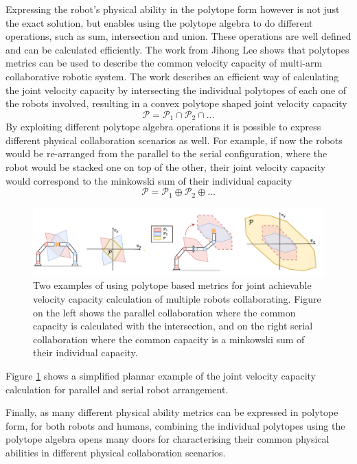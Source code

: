 Expressing the robot's physical ability in the polytope form however is not just the exact solution, but enables using the polytope algebra to do different operations, such as sum, intersection and union. These operations are well defined and can be calculated efficiently. The work from Jihong Lee \cite{lee2001velocity} shows that polytopes metrics can be used to describe the common velocity capacity of multi-arm collaborative robotic system.  The work describes an efficient way of calculating the joint velocity capacity by intersecting the individual polytopes of each one of the robots involved, resulting in a convex polytope shaped joint velocity capacity $$\mathcal{P}=\mathcal{P}_1 \cap \mathcal{P}_2  \cap \ldots$$
By exploiting different polytope algebra operations it is possible to express different physical collaboration scenarios as well. For example, if now the robots would be re-arranged from the parallel to the serial configuration, where the robot would be stacked one on top of the other, their joint velocity capacity would correspond to the minkowski sum of their individual capacity $$\mathcal{P}=\mathcal{P}_1 \oplus \mathcal{P}_2  \oplus \ldots$$

\begin{figure}[!h]
    \centering
    \includegraphics[width=\linewidth]{Chapters/imgs/collab_serial_parallel.pdf}
    \caption{Two examples of using polytope based metrics for joint achievable velocity capacity calculation of multiple robots collaborating. Figure on the left shows the parallel collaboration where the common capacity is calculated with the intersection, and on the right serial collaboration where the common capacity is a minkowski sum of their individual capacity.}
    \label{fig:collab_serial_parallel}
\end{figure}
Figure \ref{fig:collab_serial_parallel} shows a simplified plannar example of the joint velocity capacity calculation for parallel and serial robot arrangement.

Finally, as many different physical ability metrics can be expressed in polytope form, for both robots and humans, combining the individual polytopes using the polytope algebra opens many doors for characterising their common physical abilities in different physical collaboration scenarios. 


